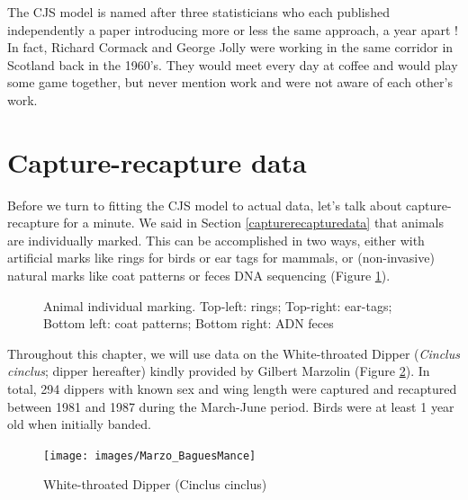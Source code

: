 \documentclass[
  12pt,
]{krantz}
\begin{document}
The CJS model is named after three statisticians who each published independently a paper introducing more or less the same approach, a year apart ! In fact, Richard Cormack and George Jolly were working in the same corridor in Scotland back in the 1960's. They would meet every day at coffee and would play some game together, but never mention work and were not aware of each other's work.

\hypertarget{capture-recapture-data}{%
\section{Capture-recapture data}\label{capture-recapture-data}}

Before we turn to fitting the CJS model to actual data, let's talk about capture-recapture for a minute. We said in Section \ref{capturerecapturedata} that animals are individually marked. This can be accomplished in two ways, either with artificial marks like rings for birds or ear tags for mammals, or (non-invasive) natural marks like coat patterns or feces DNA sequencing (Figure \ref{fig:marking}).

\begin{figure}
\newline{}\caption{Animal individual marking. Top-left: rings; Top-right: ear-tags; Bottom left: coat patterns; Bottom right: ADN feces}\label{fig:marking}
\end{figure}

Throughout this chapter, we will use data on the White-throated Dipper (\emph{Cinclus cinclus}; dipper hereafter) kindly provided by Gilbert Marzolin (Figure \ref{fig:pixdipper}). In total, 294 dippers with known sex and wing length were captured and recaptured between 1981 and 1987 during the March-June period. Birds were at least 1 year old when initially banded.

\begin{figure}

{\centering \texttt{[image: images/Marzo\_BaguesMance]} 

}

\caption{White-throated Dipper (Cinclus cinclus)}\label{fig:pixdipper}
\end{figure}
\end{document}
